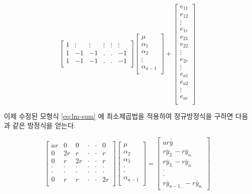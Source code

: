 \documentclass[
  10pt,
]{book}
\theoremstyle{definition}
\theoremstyle{definition}
\theoremstyle{definition}
\theoremstyle{definition}
\theoremstyle{remark}
\begin{document}
\begin{equation}
\begin{bmatrix}
1 & \vdots & \vdots & \vdots & \vdots & \vdots \\
1 & -1 & -1 & . & . & -1 \\
1 & -1 & -1 & . & . & -1 \\
\end{bmatrix}
\begin{bmatrix}
\mu \\
\alpha_{1} \\
\alpha_{2} \\
\vdots \\
\alpha_{a-1} \\
\end{bmatrix} +
\begin{bmatrix}
e_{11} \\
e_{12} \\
\vdots \\
e_{1r} \\
e_{21} \\
e_{22} \\
\vdots \\
e_{2r} \\
\vdots \\
e_{a1} \\
e_{a2} \\
\vdots \\
e_{ar} \\
\end{bmatrix}
\label{eq:lm-sum}
\end{equation}

이제 수정된 모형식 \eqref{eq:lm-sum} 에 최소제곱법을 적용하여 정규방정식을 구하면 다음과 같은 방정식을 얻는다.

\begin{equation}
\begin{bmatrix}
ar   & 0 & 0 & \cdot & \cdot & 0 \\
0 & 2r &  r  & \cdot & \cdot & r \\
0 & r   & 2r  & \cdot & \cdot & r \\
\cdot & \cdot   & \cdot  & \cdot & \cdot & \cdot \\
\cdot & \cdot   & \cdot  & \cdot & \cdot & \cdot \\
0 & r   &  r   & \cdot & \cdot & 2r \\
\end{bmatrix}
\begin{bmatrix}
\mu \\
\alpha_{2} \\
\alpha_{3} \\
\cdot \\
\cdot \\
\alpha_{a-1} \\
\end{bmatrix}
=
\begin{bmatrix}
ar \bar {\bar y} \\
r {\bar y}_{2.}-r {\bar y}_{a.} \\
r \bar y_{3.}-r {\bar y}_{a.}\\
\cdot \\
\cdot \\
r \bar y_{a-1,.} -r {\bar y}_{a.}
\end{bmatrix}
\label{eq:normaleq-sum}
\end{equation}
\end{document}
